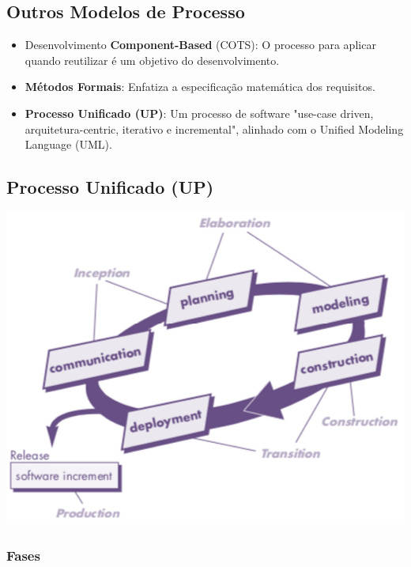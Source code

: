 \documentclass{article}
\begin{document}
\pagebreak

\subsection{Outros Modelos de Processo}

\begin{itemize}
  \item Desenvolvimento \textbf{Component-Based} (COTS): O processo
  para aplicar quando reutilizar é um objetivo do desenvolvimento.

  \item \textbf{Métodos Formais}: Enfatiza a especificação matemática
  dos requisitos.

  \item \textbf{Processo Unificado (UP)}: Um processo de software
  "use-case driven, arquitetura-centric, iterativo e incremental",
  alinhado com o Unified Modeling Language (UML).
\end{itemize}

\subsection{Processo Unificado (UP)}

\begin{center}
  \includegraphics[scale=0.4]{16}
\end{center}

\subsubsection{Fases}
\end{document}
